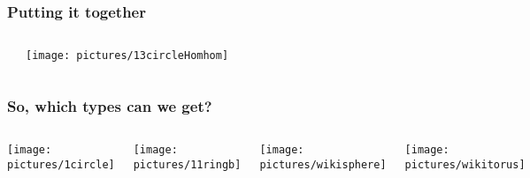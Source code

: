 \documentclass[12pt,pdflatex,hyperref={pdfstartview=Fit,bookmarks=true,bookmarksopen=true,pdfpagemode=None,colorlinks=true,linkcolor=unserblau,urlcolor=unserblau},notes=hide,t,handout]{beamer}
\begin{document}
\begin{frame}
\begin{columns}[c]
\begin{itemize}
\end{itemize}

\end{columns}

\end{frame}


\begin{frame}

\frametitle{Putting it together}

\begin{columns}[c] %

\begin{center}
\end{center}


\texttt{[image: pictures/13circleHomhom]}

\end{columns}

\end{frame}

\begin{frame}
\frametitle{So, which types can we get?}

\vspace{1.5cm}

\begin{columns}[c] %
\texttt{[image: pictures/1circle]}

\texttt{[image: pictures/11ringb]}

\texttt{[image: pictures/wikisphere]}

\texttt{[image: pictures/wikitorus]}

\end{columns}


\end{frame}
\end{document}
